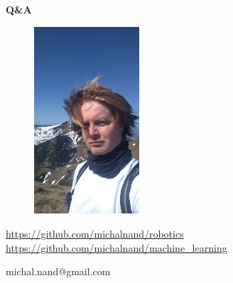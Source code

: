 \documentclass[xcolor=dvipsnames]{beamer}
\begin{document}
\begin{frame}{\bf Q\&A}

\begin{figure}[ht]
\begin{center}
\begin{minipage}{0.8\linewidth}
\begin{center}
 \includegraphics[width=0.35\textwidth]{../../pictures/me3.jpg}
\end{center}
\end{minipage}
\end{center}
\end{figure}

\url{https://github.com/michalnand/robotics}
\url{https://github.com/michalnand/machine\_learning}

\centerline{michal.nand@gmail.com}

\end{frame}
\end{document}
